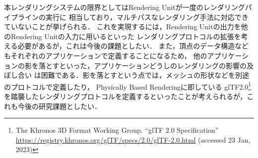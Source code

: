本レンダリングシステムの限界としてはRendering Unitが一度のレンダリングパイプラインの実行に
相当しており，マルチパスなレンダリング手法に対応できていないことが挙げられる．
これを実現するには，Rendering Unitの出力を他のRendering Unitの入力に用いるといった
レンダリングプロトコルの拡張を考える必要があるが，これは今後の課題としたい．
また，頂点のデータ構造などもそれぞれのアプリケーションで定義することになるため，
他のアプリケーションの影を落とすといった，アプリケーションどうしのレンダリングの影響の及ぼし合い
は困難である．影を落とすという点では，メッシュの形状などを別途のプロトコルで定義したり，
Physically Based Rendering\cite{physically-based-rendering}に即している
glTF2.0\footnote{The Khronos 3D Format Working Group. ``glTF 2.0 Specification'' \url{https://registry.khronos.org/glTF/specs/2.0/glTF-2.0.html} (accessed 23 Jan, 2023)}
を踏襲したレンダリングプロトコルを定義するといったことが考えられるが，これも今後の研究課題としたい．

